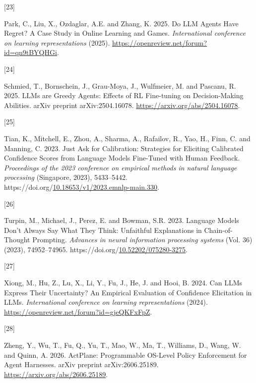 \documentclass[
  10pt,
]{article}
\newlength{\cslhangindent}
\newlength{\csllabelwidth}
\newenvironment{CSLReferences}[2] %
 {\begin{list}{}{%
  \setlength{\itemindent}{0pt}
  \setlength{\leftmargin}{0pt}
  \setlength{\parsep}{0pt}
  \ifodd #1
   \setlength{\leftmargin}{\cslhangindent}
   \setlength{\itemindent}{-1\cslhangindent}
  \fi
  \setlength{\itemsep}{#2\baselineskip}}}
 {\end{list}}
\newcommand{\CSLLeftMargin}[1]{\parbox[t]{\csllabelwidth}{\strut#1\strut}}
\newcommand{\CSLRightInline}[1]{\parbox[t]{\linewidth - \csllabelwidth}{\strut#1\strut}}
\begin{document}
\begin{CSLReferences}{0}{0}
\CSLLeftMargin{{[}23{]} }%
\CSLRightInline{Park, C., Liu, X., Ozdaglar, A.E. and Zhang, K. 2025. {Do LLM Agents Have Regret? A Case Study in Online Learning and Games}. \emph{International conference on learning representations} (2025). \url{https://openreview.net/forum?id=qn9tBYQHGi}.}

\CSLLeftMargin{{[}24{]} }%
\CSLRightInline{Schmied, T., Bornschein, J., Grau-Moya, J., Wulfmeier, M. and Pascanu, R. 2025. {LLMs are Greedy Agents: Effects of RL Fine-tuning on Decision-Making Abilities}. arXiv preprint arXiv:2504.16078. \url{https://arxiv.org/abs/2504.16078}.}

\CSLLeftMargin{{[}25{]} }%
\CSLRightInline{Tian, K., Mitchell, E., Zhou, A., Sharma, A., Rafailov, R., Yao, H., Finn, C. and Manning, C. 2023. {Just Ask for Calibration: Strategies for Eliciting Calibrated Confidence Scores from Language Models Fine-Tuned with Human Feedback}. \emph{Proceedings of the 2023 conference on empirical methods in natural language processing} (Singapore, 2023), 5433--5442. https://doi.org/\href{https://doi.org/10.18653/v1/2023.emnlp-main.330}{10.18653/v1/2023.emnlp-main.330}.}

\CSLLeftMargin{{[}26{]} }%
\CSLRightInline{Turpin, M., Michael, J., Perez, E. and Bowman, S.R. 2023. {Language Models Don't Always Say What They Think: Unfaithful Explanations in Chain-of-Thought Prompting}. \emph{Advances in neural information processing systems} (Vol. 36) (2023), 74952--74965. https://doi.org/\href{https://doi.org/10.52202/075280-3275}{10.52202/075280-3275}.}

\CSLLeftMargin{{[}27{]} }%
\CSLRightInline{Xiong, M., Hu, Z., Lu, X., Li, Y., Fu, J., He, J. and Hooi, B. 2024. {Can LLMs Express Their Uncertainty? An Empirical Evaluation of Confidence Elicitation in LLMs}. \emph{International conference on learning representations} (2024). \url{https://openreview.net/forum?id=gjeQKFxFpZ}.}

\CSLLeftMargin{{[}28{]} }%
\CSLRightInline{Zheng, Y., Wu, T., Fu, Q., Yu, T., Mao, W., Ma, T., Williams, D., Wang, W. and Quinn, A. 2026. {ActPlane: Programmable OS-Level Policy Enforcement for Agent Harnesses}. arXiv preprint arXiv:2606.25189. \url{https://arxiv.org/abs/2606.25189}.}

\end{CSLReferences}
\end{document}
